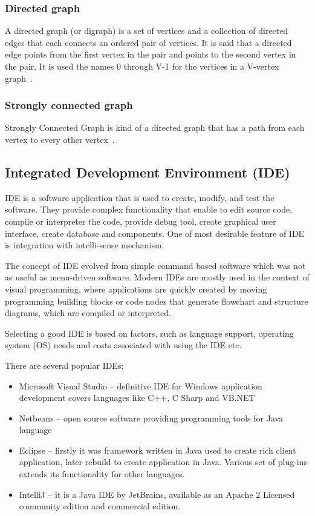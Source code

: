 \subsubsection*{Directed graph}
A directed graph (or digraph) is a set of vertices and a collection of directed edges that each connects an ordered pair of vertices. It is said that a directed edge points from the first vertex in the pair and points to the second vertex in the pair. It is used the names 0 through V-1 for the vertices in a V-vertex graph~\cite{directedGraph}.


\subsubsection*{Strongly connected graph}
Strongly Connected Graph is kind of a directed graph that has a path from each vertex to every other vertex~\cite{alain}. 

\subsection*{Integrated Development Environment (IDE)}
\ac{IDE} is a software application that is used to create, modify, and test the software. They provide complex functionality that enable to edit source code, compile or interpreter the code, provide debug tool, create graphical user interface, create database and components. One of most desirable feature of \ac{IDE} is integration with intelli-sense mechanism.  

The concept of \ac{IDE} evolved from simple command based software which was not as useful as menu-driven software. Modern \ac{IDE}s are mostly used in the context of visual programming, where applications are quickly created by moving programming building blocks or code nodes that generate flowchart and structure diagrams, which are compiled or interpreted.

Selecting a good \ac{IDE} is based on factors, such as language support, operating system (OS) needs and costs associated with using the \ac{IDE} etc.

There are several popular \ac{IDE}s:
\begin{itemize}
\item Microsoft Visual Studio -- definitive \ac{IDE} for Windows application development covers languages like C++, C Sharp and VB.NET
\item Netbeans -- open source software providing programming tools for Java language  
\item Eclipse -- firstly it was framework written in Java used to create rich client application, later rebuild to create application in Java. Various set of plug-ins extends its functionality for other languages.  
\item IntelliJ -- it is a Java \ac{IDE} by JetBrains, available as an Apache 2 Licensed community edition and commercial edition.
\end{itemize}







